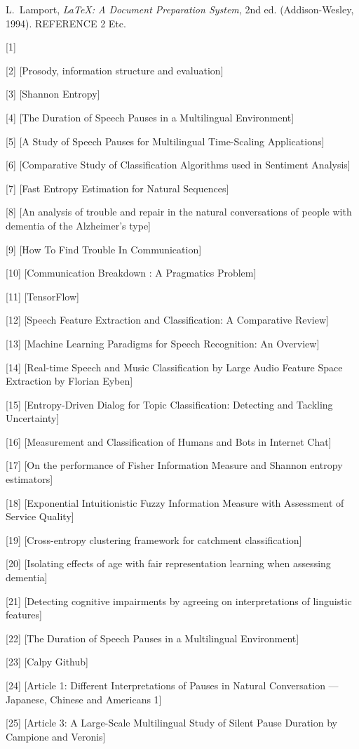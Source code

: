 \begin{thebibliography}{99}




 L.~Lamport, \emph{\LaTeX: A Document Preparation
System}, 2nd ed. (Addison-Wesley, 1994).
 REFERENCE 2
 Etc.


 



\end{thebibliography}



[1]


[2]
[Prosody, information structure and evaluation] 

[3]
[Shannon Entropy]

[4]
[The Duration of Speech Pauses in a Multilingual Environment]

[5]
[A Study of Speech Pauses for Multilingual Time-Scaling Applications] 

[6]
[Comparative Study of Classification Algorithms used in Sentiment Analysis]

[7]
[Fast Entropy Estimation for Natural Sequences] 

[8]
[An analysis of trouble and repair in the natural conversations of people with dementia of the Alzheimer’s type]

[9]
[How To Find Trouble In Communication]

[10]
[Communication Breakdown : A Pragmatics Problem]

[11]
[TensorFlow]

[12]
[Speech Feature Extraction and Classification: A Comparative Review]

[13]
[Machine Learning Paradigms for Speech Recognition: An Overview]

[14]
[Real-time Speech and Music Classification by Large Audio Feature Space Extraction by Florian Eyben]

[15]
[Entropy-Driven Dialog for Topic Classification: Detecting and Tackling Uncertainty]

[16]
[Measurement and Classification of Humans and Bots in Internet Chat]

[17]
[On the performance of Fisher Information Measure and Shannon entropy estimators]

[18]
[Exponential Intuitionistic Fuzzy Information Measure with Assessment of Service Quality]

[19]
[Cross-entropy clustering framework for catchment classification]

[20]
[Isolating effects of age with fair representation learning when assessing dementia]

[21]
[Detecting cognitive impairments by agreeing on interpretations of linguistic features]

[22]
[The Duration of Speech Pauses in a Multilingual Environment]

[23]
[Calpy Github]

[24]
[Article 1: Different Interpretations of Pauses in Natural Conversation ---Japanese, Chinese and Americans 1]

[25]
[Article 3: A Large-Scale Multilingual Study of Silent Pause Duration by Campione and Veronis]
